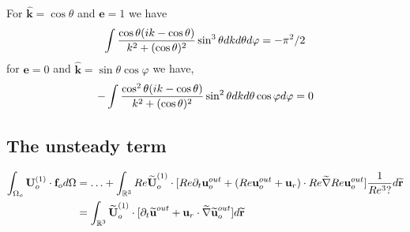 For $\hat{\textbf{k}} = \cos\theta$ and $\textbf{e}=1$ we have
\begin{equation}
    \int \frac{\cos\theta (ik - \cos\theta)}{k^2 + (\cos\theta)^2}  \sin^3\theta dkd\theta d\varphi
     = - \pi^2 /2 \\
\end{equation}
for $\textbf{e}=0$ and $\hat{\textbf{k}}=\sin\theta \cos\varphi$ we have,
\begin{equation}
    -\int \frac{\cos^2\theta (ik - \cos\theta)}{k^2 + (\cos\theta)^2} \sin^2\theta   dkd\theta  \cos\varphi d\varphi
    = 0 \\
\end{equation}


\subsection{The unsteady term}
\begin{align}
    \intO[o]{\textbf{U}_{o}^{(1)}\cdot \textbf{f}_{o}}
    &=
    \ldots +  \int_{\mathbb{R}^3}Re \widetilde{\textbf{U}}_{o}^{(1)}\cdot [Re\pddt \textbf{u}_o^{out}+  (Re \textbf{u}_{o}^{out}+\textbf{u}_r)\cdot Re \widetilde{\grad}  Re\textbf{u}_{o}^{out} ]\frac{1}{Re^3 ? } d\widetilde{\textbf{r}}\\
    &=\int_{\mathbb{R}^3} \widetilde{\textbf{U}}_{o}^{(1)}\cdot  [\pddt \widetilde{\textbf{u}}^{out}+ \textbf{u}_r \cdot  \widetilde{\grad}  \widetilde{\textbf{u}}_{o}^{out}] d\widetilde{\textbf{r}}
\end{align}

